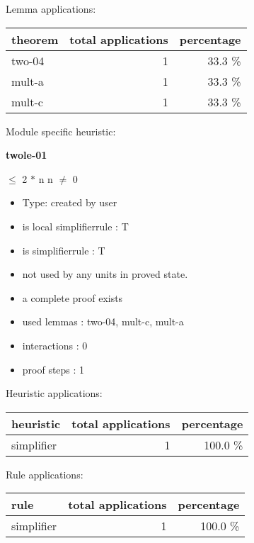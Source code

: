 \documentclass[a4paper]{article}
\begin{document}
Lemma applications:

\begin{supertabular}{l|r|r}
theorem	        & total applications & percentage \\ \hline
two-04 & 1 & 33.3 \% \\
mult-a & 1 & 33.3 \% \\
mult-c & 1 & 33.3 \% \\

\end{supertabular}

Module specific heuristic:

\pagebreak

{\LARGE\bf twole-01}\label{lemma-twole-01}

\medskip

  $\le$ 2 $*$ n \Equiv n $\neq$ 0

\begin{itemize}

\item Type: created by user

\item is local simplifierrule : T
\item is simplifierrule : T
\item not used by any units in proved state.
\item       a complete proof exists
\item       used lemmas  : two-04, mult-c, mult-a
\item       interactions : 0
\item       proof steps  : 1
\end{itemize}

\medskip


Heuristic applications:

\begin{supertabular}{l|r|r}
heuristic	& total applications & percentage \\ \hline
simplifier & 1 & 100.0 \% \\

\end{supertabular}

Rule applications:

\begin{supertabular}{l|r|r}
rule	        & total applications & percentage \\ \hline
simplifier & 1 & 100.0 \% \\

\end{supertabular}
\end{document}
